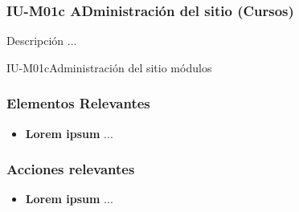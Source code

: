 
\subsubsection{IU-M01c ADministración del sitio (Cursos)}

 Descripción ...

        {IU-M01c}{Administración del sitio módulos}

\subsubsection{Elementos Relevantes}

    \begin{itemize}
    \item {\bf Lorem ipsum}
        ...
    \end{itemize}

\subsubsection{Acciones relevantes}

    \begin{itemize}
    \item {\bf Lorem ipsum}
        ...
    \end{itemize}

\clearpage

